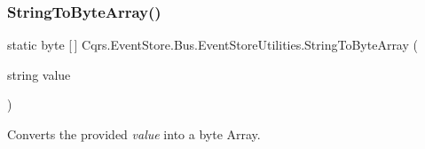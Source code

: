 \subsubsection{\texorpdfstring{String\+To\+Byte\+Array()}{StringToByteArray()}}
{\footnotesize\ttfamily static byte \mbox{[}$\,$\mbox{]} Cqrs.\+Event\+Store.\+Bus.\+Event\+Store\+Utilities.\+String\+To\+Byte\+Array (\begin{DoxyParamCaption}\item[{string}]{value }\end{DoxyParamCaption})\hspace{0.3cm}{\ttfamily [static]}}



Converts the provided {\itshape value}  into a byte Array. 

